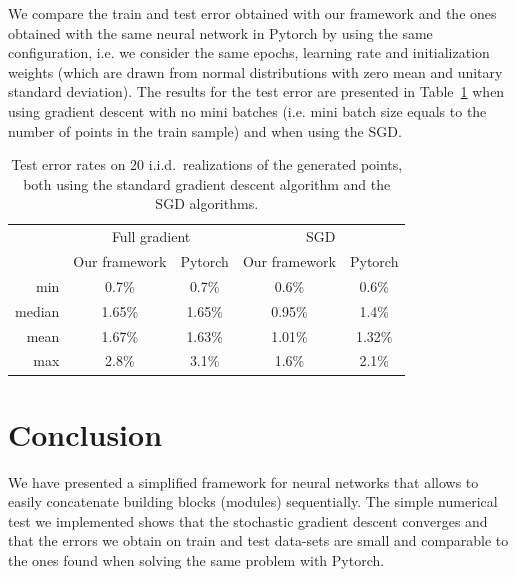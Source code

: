 \documentclass[10pt,final,a4paper]{article}
\begin{document}
We compare the train and test error obtained with our framework and the ones obtained with the same neural network in Pytorch by using the same configuration, i.e. we consider the same epochs, learning rate and initialization weights (which are drawn from normal distributions with zero mean and unitary standard deviation). The results for the test error are presented in Table~\ref{t1} when using gradient descent with no mini batches (i.e. mini batch size equals to the number of points in the train sample) and when using the SGD.

 \begin{table}
 \begin{center}
    \begin{tabular}{r c c c c}
\toprule
     $ $ & \multicolumn{2}{c}{Full gradient} & \multicolumn{2}{c}{SGD} \\
     \cmidrule(lr){2-3}
     \cmidrule(lr){4-5}
     $ $ & Our framework & Pytorch & Our framework & Pytorch \\
\midrule
    min      	& 0.7\% 		& 0.7\% 		& 0.6\% & 0.6\%\\
    median 	    & 1.65\% 	    & 1.65\% 		& 0.95\% & 1.4\% \\
    mean    	& 1.67\%		& 1.63\%		& 1.01\% & 1.32\% \\
    max      	& 2.8\% 		& 3.1\% 		& 1.6\% & 2.1\%  \\
\bottomrule
    \end{tabular}
    \end{center}
    \caption{Test error rates on 20 i.i.d.\ realizations of the generated points, both using the standard gradient descent algorithm and the SGD algorithms.}
    \label{t1}
    \end{table}
\section{Conclusion}
We have presented a simplified framework for neural networks that allows to easily concatenate building blocks (modules) sequentially. The simple numerical test we implemented shows that the stochastic gradient descent converges and that the errors we obtain on train and test data-sets are small and comparable to the ones found when solving the same problem with Pytorch. 
\end{document}
